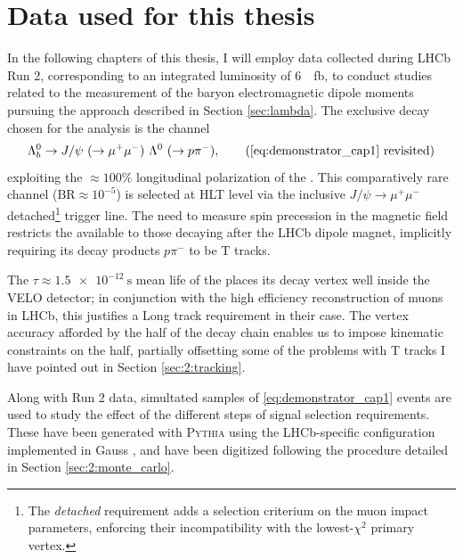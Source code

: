 \section{Data used for this thesis}
\label{sec:2:used_data}
In the following chapters of this thesis, I will employ data collected during LHCb Run 2, corresponding to an integrated luminosity of \SI{6}{\per\femto\barn}, to conduct studies related to the measurement of the \lz baryon electromagnetic dipole moments pursuing the approach described in Section \ref{sec:lambda}.
The exclusive decay chosen for the analysis is the \lbz channel
\begin{equation*}
	\Lambda_b^0 \rightarrow J/\psi~(\rightarrow \mu^+ \mu^-)~\Lambda^0~(\rightarrow p \pi^-), \tag{\ref{eq:demonstrator_cap1} revisited}
\end{equation*}
exploiting the $\approx 100\%$ longitudinal polarization of the \lz.
This comparatively rare channel ($\text{BR} \approx {10}^{-5}$) is selected at HLT level via the inclusive $J/\psi \rightarrow \mu^+\mu^-$ detached\footnote{The \textit{detached} requirement adds a selection criterium on the muon impact parameters, enforcing their incompatibility with the lowest-$\chi^2$ primary vertex.} trigger line.
The need to measure spin precession in the magnetic field restricts the available \lz to those decaying after the LHCb dipole magnet, implicitly requiring its decay products $p\pi^-$ to be T tracks.

The $\tau \approx \SI{1.5e-12}{\second}$ mean life of the \lbz \cite{PDG} places its decay vertex well inside the VELO detector; in conjunction with the high efficiency reconstruction of muons in LHCb, this justifies a Long track requirement in their case.
The \lbz vertex accuracy afforded by the \jpsi half of the decay chain enables us to impose kinematic constraints on the \lbz half, partially offsetting some of the problems with T tracks I have pointed out in Section \ref{sec:2:tracking}.

Along with Run 2 data, simultated samples of \eqref{eq:demonstrator_cap1} events are used to study the effect of the different steps of signal selection requirements.
These have been generated with \textsc{Pythia} \cite{Pythia2015} using the LHCb-specific configuration implemented in Gauss \cite{Belyaev_2011}, and have been digitized following the procedure detailed in Section \ref{sec:2:monte_carlo}.